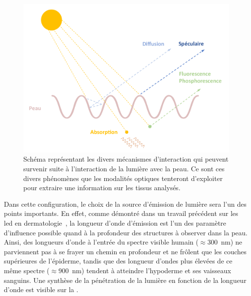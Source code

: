 \begin{figure}[H]
    \centering
    \includegraphics[width=\linewidth]{contents/chapter_2/resources/scheme_light_interaction.pdf}
    \caption{Schéma représentant les divers mécanismes d'interaction qui peuvent survenir suite à l'interaction de la lumière avec la peau. Ce sont ces divers phénomènes que les modalités optiques tenteront d'exploiter pour extraire une information sur les tissus analysés.}
    \label{fig:scheme_light_interaction}
\end{figure}\par

Dans cette configuration, le choix de la source d'émission de lumière sera l'un des points importants. En effet, comme démontré dans un travail précédent sur les \gls{led} en dermatologie~\cite{Barolet2008}, la longueur d'onde d'émission est l'un des paramètre d'influence possible quand à la profondeur des structures à observer dans la peau. Ainsi, des longueurs d'onde à l'entrée du spectre visible humain ($\approx$\SI{300}{\nano\metre}) ne parviennent pas à se frayer un chemin en profondeur et ne frôlent que les couches supérieures de l'épiderme, tandis que des longueur d'ondes plus élevées de ce même spectre ($\approx$\SI{900}{\nano\metre}) tendent à atteindre l'hypoderme et ses vaisseaux sanguins. Une synthèse de la pénétration de la lumière en fonction de la longueur d'onde est visible sur la .\par

